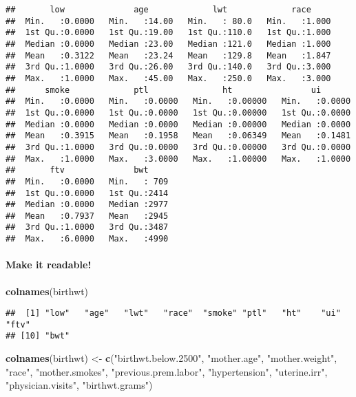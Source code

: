 \documentclass[
]{article}
\newenvironment{Shaded}{\begin{snugshade}}{\end{snugshade}}
\newcommand{\FunctionTok}[1]{\textcolor[rgb]{0.13,0.29,0.53}{\textbf{#1}}}
\newcommand{\NormalTok}[1]{#1}
\newcommand{\OtherTok}[1]{\textcolor[rgb]{0.56,0.35,0.01}{#1}}
\newcommand{\StringTok}[1]{\textcolor[rgb]{0.31,0.60,0.02}{#1}}
\begin{document}
\begin{verbatim}
##       low              age             lwt             race      
##  Min.   :0.0000   Min.   :14.00   Min.   : 80.0   Min.   :1.000  
##  1st Qu.:0.0000   1st Qu.:19.00   1st Qu.:110.0   1st Qu.:1.000  
##  Median :0.0000   Median :23.00   Median :121.0   Median :1.000  
##  Mean   :0.3122   Mean   :23.24   Mean   :129.8   Mean   :1.847  
##  3rd Qu.:1.0000   3rd Qu.:26.00   3rd Qu.:140.0   3rd Qu.:3.000  
##  Max.   :1.0000   Max.   :45.00   Max.   :250.0   Max.   :3.000  
##      smoke             ptl               ht                ui        
##  Min.   :0.0000   Min.   :0.0000   Min.   :0.00000   Min.   :0.0000  
##  1st Qu.:0.0000   1st Qu.:0.0000   1st Qu.:0.00000   1st Qu.:0.0000  
##  Median :0.0000   Median :0.0000   Median :0.00000   Median :0.0000  
##  Mean   :0.3915   Mean   :0.1958   Mean   :0.06349   Mean   :0.1481  
##  3rd Qu.:1.0000   3rd Qu.:0.0000   3rd Qu.:0.00000   3rd Qu.:0.0000  
##  Max.   :1.0000   Max.   :3.0000   Max.   :1.00000   Max.   :1.0000  
##       ftv              bwt      
##  Min.   :0.0000   Min.   : 709  
##  1st Qu.:0.0000   1st Qu.:2414  
##  Median :0.0000   Median :2977  
##  Mean   :0.7937   Mean   :2945  
##  3rd Qu.:1.0000   3rd Qu.:3487  
##  Max.   :6.0000   Max.   :4990
\end{verbatim}

\paragraph{Make it readable!}\label{make-it-readable}

\begin{Shaded}
\begin{Highlighting}[]
\FunctionTok{colnames}\NormalTok{(birthwt)}
\end{Highlighting}
\end{Shaded}

\begin{verbatim}
##  [1] "low"   "age"   "lwt"   "race"  "smoke" "ptl"   "ht"    "ui"    "ftv"  
## [10] "bwt"
\end{verbatim}

\begin{Shaded}
\begin{Highlighting}[]
\FunctionTok{colnames}\NormalTok{(birthwt) }\OtherTok{\textless{}{-}} \FunctionTok{c}\NormalTok{(}\StringTok{"birthwt.below.2500"}\NormalTok{, }\StringTok{"mother.age"}\NormalTok{,}
                       \StringTok{"mother.weight"}\NormalTok{, }\StringTok{"race"}\NormalTok{,}
                       \StringTok{"mother.smokes"}\NormalTok{, }\StringTok{"previous.prem.labor"}\NormalTok{,}
                       \StringTok{"hypertension"}\NormalTok{, }\StringTok{"uterine.irr"}\NormalTok{,}
                       \StringTok{"physician.visits"}\NormalTok{, }\StringTok{"birthwt.grams"}\NormalTok{)}
\end{Highlighting}
\end{Shaded}
\end{document}
